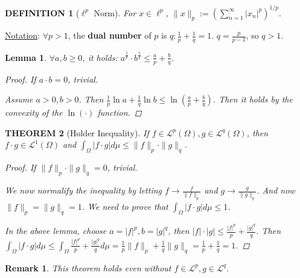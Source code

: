 \documentclass[12pt]{article}
\theoremstyle{blueplain}
\newtheorem{theorem}{THEOREM}[section]
\newtheorem{lemma}[theorem]{Lemma}
\theoremstyle{bluedef}
\newtheorem{definition}{DEFINITION}[section]
\theoremstyle{blueremark}
\newtheorem{remark}{Remark}[section]
\newcommand{\mL}{\mathcal{L}}
\numberwithin{equation}{section}
\begin{document}
\begin{definition}[$\ell^p$ Norm]
  For $x \in \ell^p$, \(\|x\|_p := \left(\sum_{n=1}^{\infty} |x_n|^p\right)^{1/p}.\)
\end{definition}



\underline{Notation}: $\forall p > 1$, the \textbf{dual number} of $p$ is $q: \frac{1}{p} + \frac{1}{q} = 1$. $q = \frac{p}{p-1}$, so $q >1$.

\begin{lemma}
  $\forall a, b \geq 0$, it holds: $a^\frac{1}{p} \cdot b^\frac{1}{q} \leq \frac{a}{p} + \frac{b}{q}$.
  \begin{proof}
    If $a \cdot b = 0$, trivial.

    Assume $a >0, b>0$. Then $\frac{1}{p} \ln a+ \frac{1}{q} \ln b \leq \ln (\frac{a}{p} + \frac{b}{q})$. Then it holds by the convexity of the $\ln (\cdot)$ function.
  \end{proof}
\end{lemma}

\begin{theorem}[Holder Inequality]
  If $f \in \mL^p(\Omega), g \in \mL^q(\Omega)$, then $f \cdot g \in \mL^1(\Omega)$ and $\int_\Omega |f \cdot g| d\mu \leq \|f\|_{p} \cdot \|g\|_{q}$.
  \begin{proof}
    If $\|f\|_p \cdot \|g\|_q = 0$, trivial.

    We now normalify the inequality by letting $f \rightarrow \frac{f}{\|f\|_p}$ and $g \rightarrow \frac{g}{\|g\|_q}$. And now $\|f\|_p = \|g\|_q = 1$. We need to prove that $\int_\Omega |f \cdot g| d\mu \leq 1$.

    In the above lemma, choose $a = |f|^p, b = |g|^q$, then $|f| \cdot |g| \leq \frac{|f|^p}{p} + \frac{|g|^q}{q}$. Then $\int_\Omega |f \cdot g| d\mu \leq \int_\Omega \frac{|f|^p}{p} + \frac{|g|^q}{q} d\mu = \frac{1}{p} \|f\|_p + \frac{1}{q}\|g\|_q = \frac{1}{p} + \frac{1}{q} = 1$.
  \end{proof}
\end{theorem}

\begin{remark}
  This theorem holds even without $f \in \mL^p, g \in \mL^q$.
\end{remark}
\end{document}
